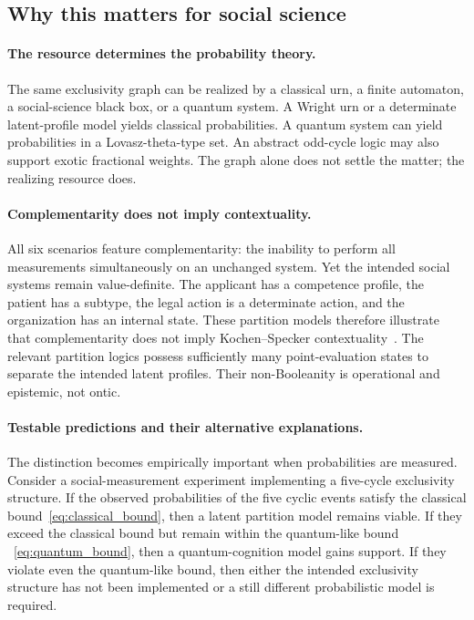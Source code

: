 \documentclass[aps,pra,twocolumn,superscriptaddress,floatfix,longbibliography]{revtex4-2}
\begin{document}
\subsection{Why this matters for social science}

\paragraph{The resource determines the probability theory.}
The same exclusivity graph can be realized by a classical urn, a
finite automaton, a social-science black box, or a quantum system.
A Wright urn or a determinate latent-profile model yields classical
probabilities. A quantum system can yield probabilities in a
Lovasz-theta-type set. An abstract odd-cycle logic may also support
exotic fractional weights. The graph alone does not settle the
matter; the realizing resource does.

\paragraph{Complementarity does not imply contextuality.}
All six scenarios feature complementarity: the inability to perform
all measurements simultaneously on an unchanged system. Yet the
intended social systems remain value-definite. The applicant has a
competence profile, the patient has a subtype, the legal action is a
determinate action, and the organization has an internal state. These
partition models therefore illustrate that complementarity does not
imply Kochen--Specker contextuality~\cite{kochen1}. The relevant
partition logics possess sufficiently many point-evaluation states to
separate the intended latent profiles. Their non-Booleanity is
operational and epistemic, not ontic.

\paragraph{Testable predictions and their alternative explanations.}
The distinction becomes empirically important when probabilities are
measured. Consider a social-measurement experiment implementing a
five-cycle exclusivity structure. If the observed probabilities of
the five cyclic events satisfy the classical bound~\eqref{eq:classical_bound},
then a latent partition model remains viable. If they exceed the
classical bound but remain within the quantum-like bound
~\eqref{eq:quantum_bound}, then a quantum-cognition model gains
support. If they violate even the quantum-like bound, then either the
intended exclusivity structure has not been implemented or a still
different probabilistic model is required.
\end{document}

